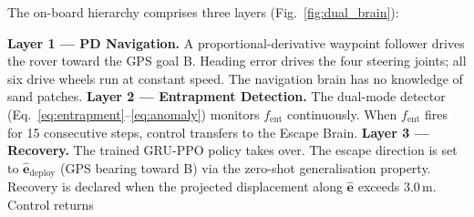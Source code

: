 \documentclass[conference]{IEEEtran}
\begin{document}
The on-board hierarchy comprises three layers (Fig.~\ref{fig:dual_brain}):

\textbf{Layer 1 --- PD Navigation.}
A proportional-derivative waypoint follower drives the rover toward the GPS
goal B. Heading error drives the four steering joints; all six drive wheels
run at constant speed. The navigation brain has no knowledge of sand patches. \textbf{Layer 2 --- Entrapment Detection.}
The dual-mode detector (Eq.~\eqref{eq:entrapment}--\eqref{eq:anomaly})
monitors $f_\text{ent}$ continuously. When $f_\text{ent}$ fires for 15
consecutive steps, control transfers to the Escape Brain. \textbf{Layer 3 --- Recovery.}
The trained GRU-PPO policy takes over. The escape direction is set to
$\hat{\mathbf{e}}_\text{deploy}$ (GPS bearing toward B) via the
zero-shot generalisation property. Recovery is declared when the projected
displacement along $\hat{\mathbf{e}}$ exceeds 3.0\,m. Control returns
\end{document}
